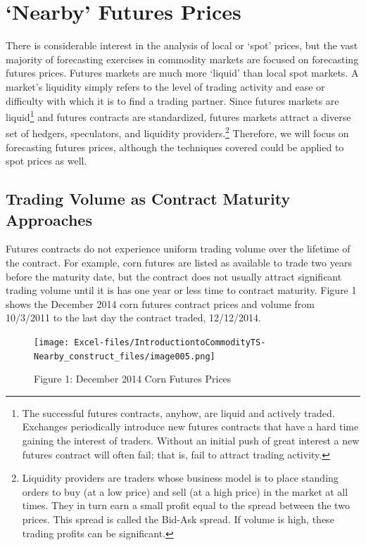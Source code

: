 \documentclass[
]{book}
\begin{document}
\hypertarget{nearby-futures-prices}{%
\section{`Nearby' Futures Prices}\label{nearby-futures-prices}}

There is considerable interest in the analysis of local or `spot' prices, but the vast majority of forecasting exercises in commodity markets are focused on forecasting futures prices. Futures markets are much more `liquid' than local spot markets. A market's liquidity simply refers to the level of trading activity and ease or difficulty with which it is to find a trading partner. Since futures markets are liquid\footnote{The successful futures contracts, anyhow, are liquid and actively traded. Exchanges periodically introduce new futures contracts that have a hard time gaining the interest of traders. Without an initial push of great interest a new futures contract will often fail; that is, fail to attract trading activity.} and futures contracts are standardized, futures markets attract a diverse set of hedgers, speculators, and liquidity providers.\footnote{Liquidity providers are traders whose business model is to place standing orders to buy (at a low price) and sell (at a high price) in the market at all times. They in turn earn a small profit equal to the spread between the two prices. This spread is called the Bid-Ask spread. If volume is high, these trading profits can be significant.} Therefore, we will focus on forecasting futures prices, although the techniques covered could be applied to spot prices as well.

\hypertarget{trading-volume-as-contract-maturity-approaches}{%
\subsection{Trading Volume as Contract Maturity Approaches}\label{trading-volume-as-contract-maturity-approaches}}

Futures contracts do not experience uniform trading volume over the lifetime of the contract. For example, corn futures are listed as available to trade two years before the maturity date, but the contract does not usually attract significant trading volume until it is has one year or less time to contract maturity. Figure 1 shows the December 2014 corn futures contract prices and volume from 10/3/2011 to the last day the contract traded, 12/12/2014.

\begin{figure}
\centering
\texttt{[image: Excel-files/IntroductiontoCommodityTS-Nearby\_construct\_files/image005.png]}
\caption{Figure 1: December 2014 Corn Futures Prices}
\end{figure}
\end{document}
